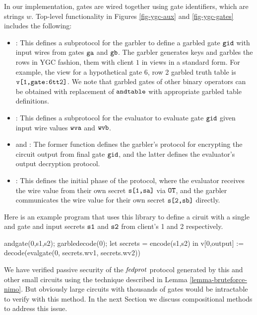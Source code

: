 In our implementation, gates are wired together using gate
identifiers, which are strings $w$. Top-level functionality in Figures
\ref{fig-ygc-aux} and \ref{fig-ygc-gates} includes the following:
\begin{itemize}
\item {}: This defines a subprotocol for the garbler
  to define a garbled gate $\texttt{gid}$ with input wires from gates
  $\texttt{ga}$ and $\texttt{gb}$. The garbler generates keys and garbles
  the rows in YGC fashion, them with client $1$ in
  views in a standard form. For example, the view for
  a hypothetical gate 6, row 2 garbled truth table is $\texttt{v[1,gate:6tt2]}$.
  We note that garbled gates of other binary operators can be obtained with
  replacement of $\texttt{andtable}$ with appropriate garbled  table definitions. 
\item {}: This defines a subprotocol for the evaluator to
  evaluate gate $\texttt{gid}$ given input wire values $\texttt{wva}$ and
  $\texttt{wvb}$.
\item {} and : The former function
  defines the garbler's protocol for encrypting the circuit
  output from final gate $\texttt{gid}$, and the latter defines
  the evaluator's output decryption protocol.
\item {}: This defines the initial phase of the protocol,
  where the evaluator receives the wire value from their own
  secret $\texttt{s[1,sa]}$ via $\texttt{OT}$, and the garbler communicates
  the wire value for their own secret $\texttt{s[2,sb]}$ directly.
\end{itemize}
Here is an example program that uses this library to define
a ciruit with a single and gate and input secrets $\texttt{s1}$ and
$\texttt{s2}$ from client's 1 and 2 respectively. 
\begin{verbatimtab}
  andgate(0,s1,s2);
  garbledecode(0);
  let secrets = encode(s1,s2) in
  v[0,output] := decode(evalgate(0, secrets.wv1, secrets.wv2))
\end{verbatimtab}
We have verified passive security of the $\mathit{fedprot}$ protocol
generated by this and other small circuits using the
technique described in Lemma \ref{lemma-bruteforce-nimo}.
But obviously large circuits with thousands of gates would be
intractable to verify with this method. In the next Section
we discuss compositional methods to address this issue. 
